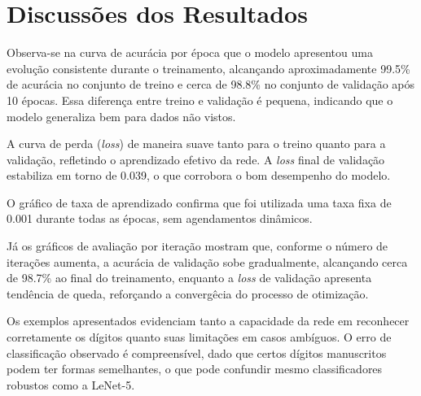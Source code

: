 \documentclass[a4paper,12pt]{article}
\begin{document}
\section{Discussões dos Resultados}

Observa-se na curva de acurácia por época que o modelo apresentou uma evolução consistente durante o treinamento, alcançando aproximadamente 99.5\% de acurácia no conjunto de treino e cerca de 98.8\% no conjunto de validação após 10 épocas. Essa diferença entre treino e validação é pequena, indicando que o modelo generaliza bem para dados não vistos.

A curva de perda (\textit{loss}) de maneira suave tanto para o treino quanto para a validação, refletindo o aprendizado efetivo da rede. A \textit{loss} final de validação estabiliza em torno de 0.039, o que corrobora o bom desempenho do modelo.

O gráfico de taxa de aprendizado confirma que foi utilizada uma taxa fixa de 0.001 durante todas as épocas, sem agendamentos dinâmicos.

Já os gráficos de avaliação por iteração mostram que, conforme o número de iterações aumenta, a acurácia de validação sobe gradualmente, alcançando cerca de 98.7\% ao final do treinamento, enquanto a \textit{loss} de validação apresenta tendência de queda, reforçando a convergêcia do processo de otimização.


Os exemplos apresentados evidenciam tanto a capacidade da rede em reconhecer corretamente os dígitos quanto suas limitações em casos ambíguos. O erro de classificação observado é compreensível, dado que certos dígitos manuscritos podem ter formas semelhantes, o que pode confundir mesmo classificadores robustos como a LeNet-5.
\end{document}
